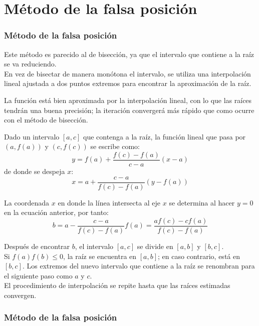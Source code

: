 \section{M\'{e}todo de la falsa posici\'{o}n}
\begin{frame}
\frametitle{M\'{e}todo de la falsa posici\'{o}n}
Este m\'{e}todo es parecido al de bisecci\'{o}n, ya que el intervalo que contiene a la ra\'{i}z se va reduciendo.
\\
\bigskip
En vez de bisectar de manera mon\'{o}tona el intervalo, se utiliza una interpolaci\'{o}n lineal ajustada a dos puntos extremos para encontrar la
aproximaci\'{o}n de la ra\'{i}z.
\end{frame}
\begin{frame}
La funci\'{o}n est\'{a} bien aproximada por la interpolaci\'{o}n lineal, con lo que las ra\'{i}ces tendr\'{a}n una buena precisi\'{o}n; la iteraci\'{o}n converger\'{a} m\'{a}s r\'{a}pido que como ocurre con el m\'{e}todo de
bisecci\'{o}n.
\end{frame}
\begin{frame}
Dado un intervalo $[a,c]$ que contenga a la raíz, la funci\'{o}n lineal que pasa por $(a,f(a))$ y $(c,f(c))$ se escribe como:
\[ y = f(a) + \dfrac{f(c)-f(a)}{c-a}(x-a) \]
de donde se despeja $x$:
\[ x = a + \dfrac{c-a}{f(c)-f(a)}(y-f(a)) \]
\end{frame}
\begin{frame}
La coordenada $x$ en donde la l\'{i}nea intersecta al eje $x$ se determina al hacer $y=0$ en la ecuaci\'{o}n anterior, por tanto:
\[ b = a - \dfrac{c-a}{f(c)-f(a)}f(a) = \dfrac{af(c)-cf(a)}{f(c)-f(a)} \]
\end{frame}
\begin{frame}
Despu\'{e}s de encontrar $b$, el intervalo $[a,c]$ se divide en $[a,b]$ y $[b,c]$.
\\
\bigskip
Si $f(a)f(b) \leq 0$, la ra\'{i}z se encuentra en $[a,b]$; en caso contrario, est\'{a} en $[b,c]$. Los extremos del nuevo intervalo que contiene a la ra\'{i}z se renombran para el siguiente paso como $a$ y $c$.
\\
\bigskip
El procedimiento de interpolaci\'{o}n se repite hasta que las ra\'{i}ces estimadas convergen.
\end{frame}
\begin{frame}[fragile]
\frametitle{M\'{e}todo de la falsa posici\'{o}n}
\begin{center}
\end{center}
\end{frame}
